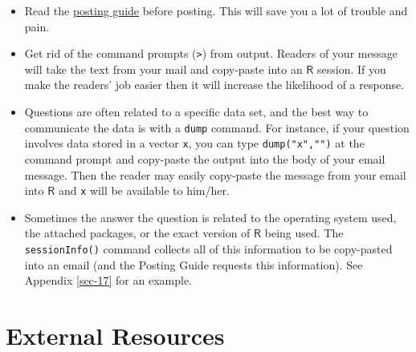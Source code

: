 \documentclass[captions=tableheading]{scrbook}
\begin{document}
\begin{itemize}
\item Read the \href{http://www.r-project.org/posting-guide.html}{posting guide} before posting. This will save you a lot of trouble and pain.
\item Get rid of the command prompts (\texttt{>}) from output. Readers of your message will take the text from your mail and copy-paste into an \(\mathsf{R}\) session. If you make the readers' job easier then it will increase the likelihood of a response.
\item Questions are often related to a specific data set, and the best way to communicate the data is with a \texttt{dump} command. For instance, if your question involves data stored in a vector \texttt{x}, you can type \texttt{dump("x","")} at the command prompt and copy-paste the output into the body of your email message. Then the reader may easily copy-paste the message from your email into \(\mathsf{R}\) and \texttt{x} will be available to him/her.
\item Sometimes the answer the question is related to the operating system used, the attached packages, or the exact version of \(\mathsf{R}\) being used. The \texttt{sessionInfo()} command collects all of this information to be copy-pasted into an email (and the Posting Guide requests this information). See Appendix \ref{sec-17} for an example.
\end{itemize}
\section{External Resources}
\label{sec-2-5}
\end{document}
